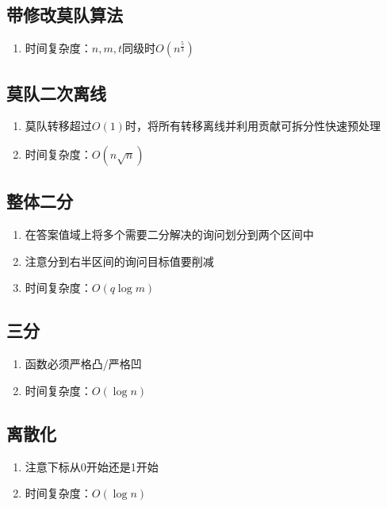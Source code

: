 \documentclass[twocolumn,a4,8pt]{article}  %
\begin{document}
	 	\subsection{带修改莫队算法}
			\noindent\begin{enumerate}
				\item 时间复杂度：$n,m,t$同级时$O(n^{\frac{5}{3}})$
			\end{enumerate}
	 	 	
	 	 	
	 	\subsection{莫队二次离线}
			\noindent\begin{enumerate}
				\item 莫队转移超过$O(1)$时，将所有转移离线并利用贡献可拆分性快速预处理
				\item 时间复杂度：$O(n\sqrt{n})$
			\end{enumerate}
	 	 	
	 	 	
	 	\subsection{整体二分}
			\noindent\begin{enumerate}
				\item 在答案值域上将多个需要二分解决的询问划分到两个区间中
				\item 注意分到右半区间的询问目标值要削减
				\item 时间复杂度：$O(q\log m)$
			\end{enumerate}
	 	 	
	 	 	
	 	\subsection{三分}
			\noindent\begin{enumerate}
				\item 函数必须严格凸/严格凹
				\item 时间复杂度：$O(\log n)$
			\end{enumerate}
	 	 	
	 	 	
	 	\subsection{离散化}
			\noindent\begin{enumerate}
				\item 注意下标从0开始还是1开始
				\item 时间复杂度：$O(\log n)$
			\end{enumerate}
	 	 	
	 	 	
\end{document}

